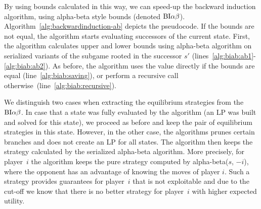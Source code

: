By using bounds calculated in this way, we can speed-up the backward induction algorithm, using alpha-beta style bounds (denoted $\textrm{BI}\alpha\beta$).
Algorithm~\ref{alg:backwardinduction-ab} depicts the pseudocode.
If the bounds are not equal, the algorithm starts evaluating successors of the current state.
First, the algorithm calculates upper and lower bounds using alpha-beta algorithm on serialized variants of the subgame rooted in the
successor $s'$ (lines~\ref{alg:biab:ab1}-\ref{alg:biab:ab2}).
As before, the algorithm uses the value directly if the bounds are equal (line~\ref{alg:biab:saving}), or perform a recursive call
otherwise~(line~\ref{alg:biab:recursive}).

We distinguish two cases when extracting the equilibrium strategies from the $\textrm{BI}\alpha\beta$. %
In case that a state was fully evaluated by the algorithm (\ie an LP was built and solved for this state), we proceed as before and
keep the pair of equilibrium strategies in this state.
However, in the other case, the algorithms prunes certain branches and does not create an LP for all states.
The algorithm then keeps the strategy calculated by the serialized alpha-beta algorithm.
More precisely, for player~$i$ the algorithm keeps the pure strategy computed by alpha-beta($s$, $-i$), where the opponent has an advantage of knowing the moves of player $i$.
Such a strategy provides guarantees for player~$i$ that is not exploitable and due to the cut-off we know that there is no better strategy for player~$i$ with higher expected utility.

